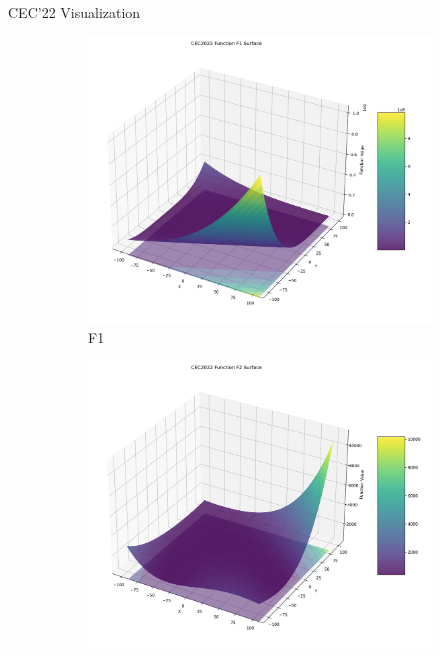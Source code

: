 \documentclass[aspectratio=169]{beamer}
\begin{document}
\begin{frame}{CEC'22 Visualization}
    \centering
    \begin{figure}
        \centering
        \begin{subfigure}[b]{0.19\textwidth}
            \includegraphics[width=\textwidth]{../plots/cec_bench/function_surface_f1.png}
            \caption*{F1}
        \end{subfigure}
        \hfill
        \begin{subfigure}[b]{0.19\textwidth}
            \includegraphics[width=\textwidth]{../plots/cec_bench/function_surface_f2.png}

\end{subfigure}
\end{figure}
\end{frame}
\end{document}

